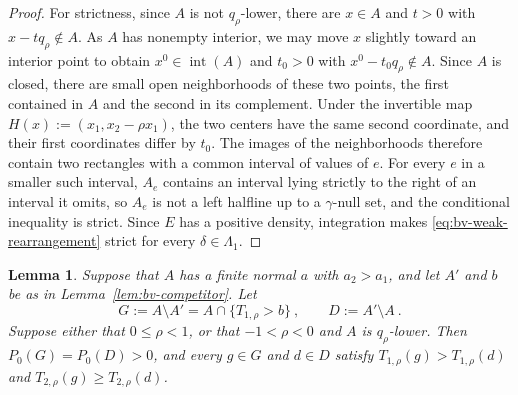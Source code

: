 \documentclass[11pt]{article}
\numberwithin{equation}{section}
\newtheorem{lemma}{Lemma}
\theoremstyle{definition}
\begin{document}
\begin{proof}
For strictness, since $A$ is not $q_\rho$-lower, there are $x\in A$ and $t>0$ with $x-tq_\rho\notin A$. As $A$ has nonempty interior, we may move $x$ slightly toward an interior point to obtain $x^0\in\operatorname{int}(A)$ and $t_0>0$ with $x^0-t_0q_\rho\notin A$. Since $A$ is closed, there are small open neighborhoods of these two points, the first contained in $A$ and the second in its complement. Under the invertible map $H(x):=(x_1,x_2-\rho x_1)$, the two centers have the same second coordinate, and their first coordinates differ by $t_0$. The images of the neighborhoods therefore contain two rectangles with a common interval of values of $e$. For every $e$ in a smaller such interval, $A_e$ contains an interval lying strictly to the right of an interval it omits, so $A_e$ is not a left halfline up to a $\gamma$-null set, and the conditional inequality is strict. Since $E$ has a positive density, integration makes \eqref{eq:bv-weak-rearrangement} strict for every $\delta\in\Lambda_1$.
\end{proof}

\begin{lemma}\label{lem:bv-gain-loss}
Suppose that $A$ has a finite normal $a$ with $a_2>a_1$, and let $A'$ and $b$ be as in Lemma~\ref{lem:bv-competitor}. Let
\[
G:=A\setminus A'=A\cap\{T_{1,\rho}>b\}~,
\qquad
D:=A'\setminus A~.
\]
Suppose either that $0\le\rho<1$, or that $-1<\rho<0$ and $A$ is $q_\rho$-lower. Then $P_0(G)=P_0(D)>0$, and every $g\in G$ and $d\in D$ satisfy $T_{1,\rho}(g)>T_{1,\rho}(d)$ and $T_{2,\rho}(g)\ge T_{2,\rho}(d)$.
\end{lemma}
\end{document}
